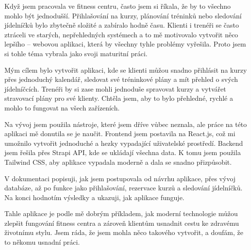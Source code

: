 \documentclass[12pt, a4paper,
twoside,        %
openany
]{report}
\begin{document}
Když jsem pracovala ve fitness centru, často jsem si říkala, že by to všechno mohlo být jednodušší. Přihlašování na kurzy, plánování tréninků nebo sledování jídelníčků bylo zbytečně složité a zabíralo hodně času. Klienti i trenéři se často ztráceli ve starých, nepřehledných systémech a to mě motivovalo vytvořit něco lepšího – webovou aplikaci, která by všechny tyhle problémy vyřešila. Proto jsem si tohle téma vybrala jako svoji maturitní práci.

Mým cílem bylo vytvořit aplikaci, kde se klienti můžou snadno přihlásit na kurzy přes jednoduchý kalendář, sledovat své tréninkové plány a mít přehled o svých jídelníčcích. Trenéři by si zase mohli jednoduše spravovat kurzy a vytvářet stravovací plány pro své klienty. Chtěla jsem, aby to bylo přehledné, rychlé a mohlo to fungovat na všech zařízeních.

Na vývoj jsem použila nástroje, které jsem dříve vůbec neznala, ale práce na této aplikaci mě donutila se je naučit. Frontend jsem postavila na React.js, což mi umožnilo vytvořit jednoduché a hezky vypadající uživatelské prostředí. Backend jsem řešila přes Strapi API, kde se ukládají všechna data. K tomu jsem použila Tailwind CSS, aby aplikace vypadala moderně a dala se snadno přizpůsobit.

V dokumentaci popisuji, jak jsem postupovala od návrhu aplikace, přes vývoj databáze, až po funkce jako přihlašování, rezervace kurzů a sledování jídelníčků. Na konci hodnotím výsledky a ukazuji, jak aplikace funguje.

Tahle aplikace je podle mě dobrým příkladem, jak moderní technologie můžou zlepšit fungování fitness centra a zároveň klientům usnadnit cestu ke zdravému životnímu stylu. Jsem ráda, že jsem mohla něco takového vytvořit, a doufám, že to někomu usnadní práci.
        \vspace{18pt}
        \clearpage 
\end{document}
